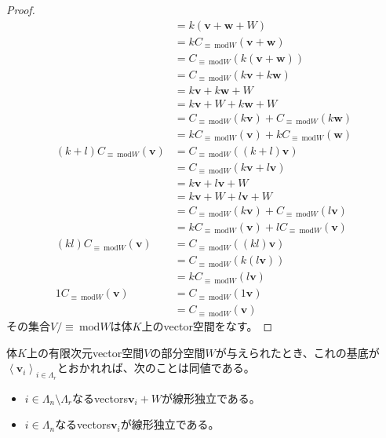 \documentclass[dvipdfmx]{jsarticle}
\begin{document}
\begin{proof}
\begin{align*}
&= k\left( \mathbf{v} + \mathbf{w} + W \right)\\
&= kC_{\equiv \ \mathrm{mod}W}\left( \mathbf{v} + \mathbf{w} \right)\\
&= C_{\equiv \ \mathrm{mod}W}\left( k\left( \mathbf{v} + \mathbf{w} \right) \right)\\
&= C_{\equiv \ \mathrm{mod}W}\left( k\mathbf{v} + k\mathbf{w} \right)\\
&= k\mathbf{v} + k\mathbf{w} + W\\
&= k\mathbf{v} + W + k\mathbf{w} + W\\
&= C_{\equiv \ \mathrm{mod}W}\left( k\mathbf{v} \right) + C_{\equiv \ \mathrm{mod}W}\left( k\mathbf{w} \right)\\
&= kC_{\equiv \ \mathrm{mod}W}\left( \mathbf{v} \right) + kC_{\equiv \ \mathrm{mod}W}\left( \mathbf{w} \right)\\
(k + l)C_{\equiv \ \mathrm{mod}W}\left( \mathbf{v} \right) &= C_{\equiv \ \mathrm{mod}W}\left( (k + l)\mathbf{v} \right)\\
&= C_{\equiv \ \mathrm{mod}W}\left( k\mathbf{v} + l\mathbf{v} \right)\\
&= k\mathbf{v} + l\mathbf{v} + W\\
&= k\mathbf{v} + W + l\mathbf{v} + W\\
&= C_{\equiv \ \mathrm{mod}W}\left( k\mathbf{v} \right) + C_{\equiv \ \mathrm{mod}W}\left( l\mathbf{v} \right)\\
&= kC_{\equiv \ \mathrm{mod}W}\left( \mathbf{v} \right) + lC_{\equiv \ \mathrm{mod}W}\left( \mathbf{v} \right)\\
(kl)C_{\equiv \ \mathrm{mod}W}\left( \mathbf{v} \right) &= C_{\equiv \ \mathrm{mod}W}\left( (kl)\mathbf{v} \right)\\
&= C_{\equiv \ \mathrm{mod}W}\left( k\left( l\mathbf{v} \right) \right)\\
&= kC_{\equiv \ \mathrm{mod}W}\left( l\mathbf{v} \right)\\
1C_{\equiv \ \mathrm{mod}W}\left( \mathbf{v} \right) &= C_{\equiv \ \mathrm{mod}W}\left( 1\mathbf{v} \right)\\
&= C_{\equiv \ \mathrm{mod}W}\left( \mathbf{v} \right)
\end{align*}
その集合${V}/{\equiv \ \mathrm{mod}W}$は体$K$上のvector空間をなす。
\end{proof}
\begin{thm}\label{2.4.1.14}
体$K$上の有限次元vector空間$V$の部分空間$W$が与えられたとき、これの基底が$\left\langle \mathbf{v}_{i} \right\rangle_{i \in \varLambda_{r}}$とおかれれば、次のことは同値である。
\begin{itemize}
\item
  $i \in \varLambda_{n} \setminus \varLambda_{r}$なるvectors$\mathbf{v}_{i} + W$が線形独立である。
\item
  $i \in \varLambda_{n}$なるvectors$\mathbf{v}_{i}$が線形独立である。
\end{itemize}
\end{thm}
\end{document}
